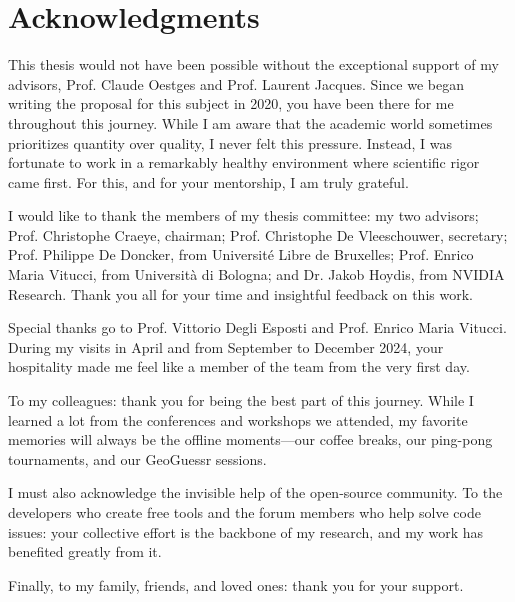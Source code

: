 \chapter{Acknowledgments}

This thesis would not have been possible without the exceptional support of my advisors, Prof. Claude Oestges and Prof. Laurent Jacques. Since we began writing the proposal for this subject in 2020, you have been there for me throughout this journey. While I am aware that the academic world sometimes prioritizes quantity over quality, I never felt this pressure. Instead, I was fortunate to work in a remarkably healthy environment where scientific rigor came first. For this, and for your mentorship, I am truly grateful.

I would like to thank the members of my thesis committee: my two advisors; Prof. Christophe Craeye, chairman; Prof. Christophe De Vleeschouwer, secretary; Prof. Philippe De Doncker, from Université Libre de Bruxelles; Prof. Enrico Maria Vitucci, from Università di Bologna; and Dr. Jakob Hoydis, from NVIDIA Research. Thank you all for your time and insightful feedback on this work.

Special thanks go to Prof. Vittorio Degli Esposti and Prof. Enrico Maria Vitucci. During my visits in April and from September to December 2024, your hospitality made me feel like a member of the team from the very first day.

To my colleagues: thank you for being the best part of this journey. While I learned a lot from the conferences and workshops we attended, my favorite memories will always be the offline moments---our coffee breaks, our ping-pong tournaments, and our GeoGuessr sessions.

I must also acknowledge the invisible help of the open-source community. To the developers who create free tools and the forum members who help solve code issues: your collective effort is the backbone of my research, and my work has benefited greatly from it.

Finally, to my family, friends, and loved ones: thank you for your support.
